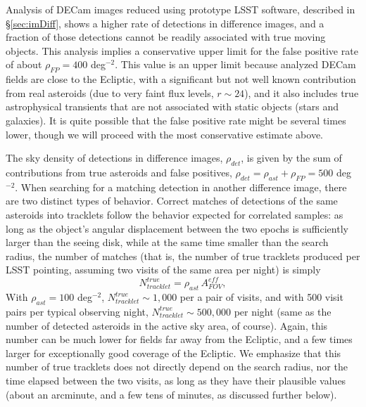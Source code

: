 Analysis of DECam images reduced using prototype LSST software, described in \S\ref{sec:imDiff},
shows a higher rate of detections in difference images, and a fraction of those detections
cannot be readily associated with true moving objects. This analysis implies a conservative
upper limit for the false positive rate of about $\rho_{FP} =  400$ deg$^{-2}$. This value
is an upper limit because analyzed DECam fields are close to the Ecliptic, with a significant but
not well known contribution from real asteroids (due to very faint flux levels, $r \sim 24$),
and it also includes true astrophysical transients that are not associated with static objects
(stars and galaxies). It is quite possible that the false positive rate might be several
times lower, though we will proceed with the most conservative estimate above.

The sky density of detections in difference images, $\rho_{det}$, is given by
the sum of contributions from true asteroids and false positives, $\rho_{det} = \rho_{ast} + \rho_{FP}
= 500$ deg$^{-2}$. When searching for a matching detection in another difference image, there are
two distinct types of behavior. Correct matches of detections of the same asteroids into tracklets follow the behavior
expected for correlated samples: as long as the object's angular displacement between the two epochs
is sufficiently larger than the seeing disk, while at the same time smaller than the search radius, the
number of matches (that is, the number of true tracklets produced per LSST pointing, assuming
two visits of the same area per night) is simply
\begin{equation}
                  N_{tracklet}^{true} = \rho_{ast}  \, A_{FOV}^{eff},
\end{equation}
With  $\rho_{ast} = 100$ deg$^{-2}$, $N_{tracklet}^{true} \sim 1,000$ per a pair of visits, and with
500 visit pairs per typical observing night, $N_{tracklet}^{true} \sim 500,000$ per night (same as
the number of detected asteroids in the active sky area, of course). Again,
this number can be much lower for fields far away from the Ecliptic, and a few times larger
for exceptionally good coverage of the Ecliptic. We emphasize that this number of true tracklets
does not directly depend on the search radius, nor the time elapsed between the two visits, as long
as they have their plausible values (about an arcminute, and a few tens of minutes, as discussed
further below).



